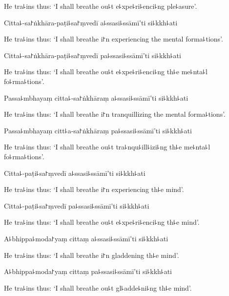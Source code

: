 \begin{english}
  He tra꜕ins thus: `I shall breathe ou꜕t e꜕xpe꜕ri꜕enci꜕ng ple꜕asure'.
\end{english}

Citta꜕-sa꜓ṅkhāra-paṭi꜕sa꜓ṃvedī a꜕ssasi꜕ssāmī'ti si꜕kkh꜕ati

\begin{english}
  He tra꜕ins thus: `I shall breathe i꜓n experiencing the mental forma꜕tions'.
\end{english}

Citta꜕-sa꜓ṅkhāra-paṭi꜕sa꜓ṃvedī pa꜕ssasi꜕ssāmī'ti si꜕kkh꜕ati

\begin{english}
  He tra꜕ins thus: `I shall breathe ou꜕t e꜕xpe꜕ri꜕enci꜕ng th꜕e me꜕nta꜕l fo꜕rma꜕tions'.
\end{english}

Passa꜕mbhayaṃ citta꜕-sa꜓ṅkhāraṃ a꜕ssasi꜕ssāmī'ti si꜕kkh꜕ati

\begin{english}
  He tra꜕ins thus: `I shall breathe i꜓n tranquillizing the mental forma꜕tions'.
\end{english}

Passa꜕mbhayaṃ citt꜕a-sa꜓ṅkhāraṃ pa꜕ssasi꜕ssāmī'ti si꜕kkh꜕ati

\begin{english}
  He tra꜕ins thus: `I shall breathe ou꜕t tra꜕nqu꜕ill꜕izi꜕ng th꜕e me꜕nta꜕l fo꜕rma꜕tions'.
\end{english}

Citta꜕-paṭi꜕sa꜓ṃvedī a꜕ssasi꜕ssāmī'ti si꜕kkh꜕ati

\begin{english}
  He tra꜕ins thus: `I shall breathe i꜓n experiencing th꜕e mind'.
\end{english}

Citta꜕-paṭi꜕sa꜓ṃvedī pa꜕ssasi꜕ssāmī'ti si꜕kkh꜕ati

\begin{english}
  He tra꜕ins thus: `I shall breathe ou꜕t e꜕xpe꜕ri꜕enci꜕ng th꜕e mind'.
\end{english}

A꜕bhippa꜕moda꜓yaṃ cittaṃ a꜕ssasi꜕ssāmī'ti si꜕kkh꜕ati

\begin{english}
  He tra꜕ins thus: `I shall breathe i꜓n gladdening th꜕e mind'.
\end{english}

A꜕bhippa꜕moda꜓yaṃ cittaṃ pa꜕ssasi꜕ssāmī'ti si꜕kkh꜕ati

\begin{english}
  He tra꜕ins thus: `I shall breathe ou꜕t gl꜕adde꜕ni꜕ng th꜕e mind'.
\end{english}

